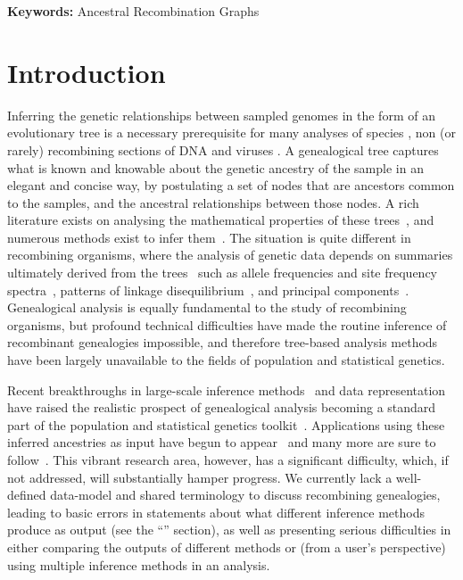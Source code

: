 \documentclass{article}
\begin{document}
\textbf{Keywords:} Ancestral Recombination Graphs

\section*{Introduction}
Inferring the genetic relationships between sampled genomes in the form of an
evolutionary tree is a necessary prerequisite for many analyses of species \citep{rannala2003genetics}, non (or
rarely) recombining sections of DNA \citep{cann1987mitochondrial,underhill2001annalsofhumangenetics} and viruses \citep{grenfell2004science}.
A genealogical tree captures what is known and
knowable about the genetic ancestry of the sample in an elegant and concise
way, by postulating a set of nodes that are ancestors common to the samples,
and the ancestral relationships between those nodes. A rich literature exists
on analysing the mathematical properties of these
trees~\citep{steel2016phylogeny}, and numerous
methods exist to infer them~\citep{felsenstein2004inferring}. The situation is
quite different in recombining organisms, where the analysis of genetic data
depends on summaries ultimately derived from the
trees~\citep{tajima1983evolutionary,tavare1984line}
such as allele frequencies and site frequency
spectra~\citep{achaz2009frequency,ralph2020efficiently},
patterns of linkage disequilibrium~\citep{mcvean2002genealogical}, and principal
components~\citep{mcvean2009genealogical}. Genealogical analysis is equally
fundamental to the study of recombining organisms, but profound technical
difficulties have made the routine inference of recombinant genealogies
impossible, and therefore tree-based analysis methods have been largely
unavailable to the fields of population and statistical
genetics.

Recent breakthroughs in large-scale inference
methods~\citep{rasmussen2014genome,kelleher2019inferring,speidel2019method,wohns2022unified}
and data representation~\citep{kelleher2016efficient}
have raised the realistic prospect of genealogical analysis becoming a standard part
of the population and statistical genetics toolkit~\citep{hejase2020summary}.
Applications using these inferred ancestries as input have
begun to
appear~\citep{osmond2021estimating,zhang2021biobank,fan2022genealogical}
and many more are sure to
follow~\citep{harris2019database}. This vibrant research area, however,
has a significant difficulty, which, if not addressed, will substantially hamper
progress. We currently lack a well-defined data-model and shared terminology
to discuss recombining genealogies, leading to basic errors in statements
about what different inference methods produce as output (see the
``'' section), as well as presenting serious
difficulties in either comparing the outputs of different methods or
(from a user's perspective) using multiple inference methods in an analysis.
\end{document}
